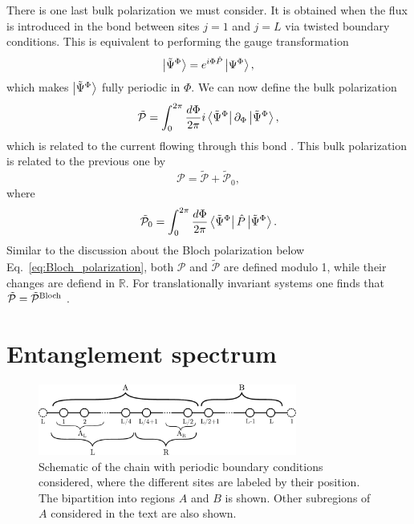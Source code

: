 \documentclass[twocolumn,amsmath,longbibliography,amssymb,superscriptaddress]{revtex4-1}
\begin{document}
There is one last bulk polarization we must consider. 
It is obtained when the flux is introduced in the bond between sites $j=1$ and $j=L$ via twisted boundary conditions. This is equivalent to performing the gauge transformation
\begin{align}\label{eq:Psi_tilde}
\ket{\tilde{\Psi}^\Phi}=e^{i\Phi \hat{P}}\ket{\Psi^\Phi},
\end{align}
which makes $\ket{\tilde{\Psi}^\Phi}$ fully periodic in $\Phi$. We can now define the bulk polarization
\begin{equation}
\tilde{\mathcal{P}} = \int_0^{2\pi}\frac{d\Phi}{2\pi} i\bra{\tilde{\Psi}^\Phi}\partial_\Phi \ket{\tilde{\Psi}^\Phi},
\label{eq:p_tilde}
\end{equation}
which is related to the current flowing through this bond \cite{Watanabe2018}. This bulk polarization is related to the previous one by 
\begin{equation}
\mathcal{P}= \tilde{\mathcal{P}}+\tilde{\mathcal{P}}_0,
\end{equation} 
where
\begin{equation}
\tilde {\mathcal{P}}_0= \int_0^{2\pi}\frac{d\Phi}{2\pi} \bra{\tilde{\Psi}^\Phi}\hat{P}\ket{\tilde{\Psi}^\Phi}.
\end{equation} 
Similar to the discussion about the Bloch polarization below Eq.~\eqref{eq:Bloch_polarization}, both $\mathcal{P}$ and $\tilde{\mathcal{P}}$ are defined modulo 1, while their changes are defiend in $\mathbb{R}$. For translationally invariant systems one finds that $\tilde{\mathcal{P}} = \tilde{\mathcal{P}}^{\rm Bloch}$ \cite{Watanabe2018}. 


\section{Entanglement spectrum}
\label{section:ES}

\begin{figure}[t]
	\centering
	\includegraphics[width=85mm]{chain.pdf}
	\caption{Schematic of the chain with periodic boundary conditions considered, where the different sites are labeled by their position. The bipartition into regions $A$ and $B$ is shown. Other subregions of $A$ considered in the text are also shown. }
\label{fig:chain}
\end{figure}
\end{document}

